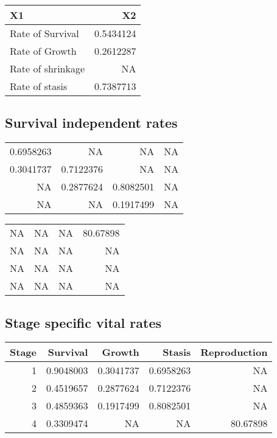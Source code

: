 \documentclass[
]{article}
\begin{document}
\begin{tabular}{lr}
\toprule
X1 & X2\\
\midrule
Rate of Survival & 0.5434124\\
Rate of Growth & 0.2612287\\
Rate of shrinkage & NA\\
Rate of stasis & 0.7387713\\
\bottomrule
\end{tabular}

\hypertarget{survival-independent-rates}{%
\subsection{Survival independent
rates}\label{survival-independent-rates}}

\begin{tabular}{rrrr}
\toprule
0.6958263 & NA & NA & NA\\
0.3041737 & 0.7122376 & NA & NA\\
NA & 0.2877624 & 0.8082501 & NA\\
NA & NA & 0.1917499 & NA\\
\bottomrule
\end{tabular}

\begin{tabular}{rrrr}
\toprule
NA & NA & NA & 80.67898\\
NA & NA & NA & NA\\
NA & NA & NA & NA\\
NA & NA & NA & NA\\
\bottomrule
\end{tabular}

\hypertarget{stage-specific-vital-rates}{%
\subsection{Stage specific vital
rates}\label{stage-specific-vital-rates}}

\begin{tabular}{rrrrr}
\toprule
Stage & Survival & Growth & Stasis & Reproduction\\
\midrule
1 & 0.9048003 & 0.3041737 & 0.6958263 & NA\\
2 & 0.4519657 & 0.2877624 & 0.7122376 & NA\\
3 & 0.4859363 & 0.1917499 & 0.8082501 & NA\\
4 & 0.3309474 & NA & NA & 80.67898\\
\bottomrule
\end{tabular}
\end{document}
